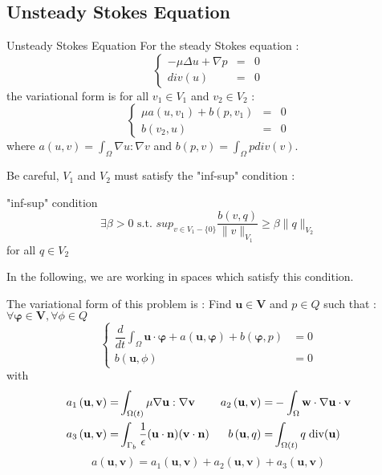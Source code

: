 \subsection{Unsteady Stokes Equation}

\begin{frame}{Unsteady Stokes Equation}
For the steady Stokes equation :
$$
\left\{
\begin{array}{rcl}
- \mu \Delta u + \nabla p & = & 0 \\
div(u) & = & 0 
\end{array}
\right. $$
the variational form is for all $v_1 \in V_1$ and $v_2 \in V_2$ :
$$
\left\{
\begin{array}{rcl}
 \mu a(u,v_1) + b(p,v_1) & = & 0 \\
b(v_2,u) & = & 0 
\end{array}
\right. $$
where $a(u,v) = \int_{\Omega} \nabla u : \nabla v$ and $b(p,v)=\int_{\Omega} p div(v)$.
\end{frame}

\begin{frame}
Be careful, $V_1$ and $V_2$ must satisfy the "inf-sup" condition :
\begin{block}{"inf-sup" condition}
$$\exists \beta > 0 \text{ s.t. } sup_{v \in V_1 -\{0\}} \dfrac{b(v,q)}{\| v \|_{V_1}} \geq \beta \| q \|_{V_2}$$
for all $q \in V_2$
\end{block}
In the following, we are working in spaces which satisfy this condition.
\end{frame}

\begin{frame}
  The variational form of this problem is :
    Find $\mathbf{u}\in \mathbf{V}$ and $p\in Q$ such that : $\forall \bm{\varphi}\in \mathbf{V}, \forall \phi\in Q$
  \begin{equation*}
    \left\{
    \begin{aligned}
      \dfrac{d}{dt}\int_\Omega \mathbf{u}\cdot\bm{\varphi}
      + a(\mathbf{u},\bm{\varphi}) + b\left(\bm{\varphi},p\right) 
      &=0\\
      b(\mathbf{u},\phi) &= 0
    \end{aligned}
    \right.
  \end{equation*}
  with
  \begin{align*}
    a_1\left(\mathbf{u},\mathbf{v}\right) =& \int_{\Omega(t)} \mu \nabla \mathbf{u} : \nabla \mathbf{v}
    & a_2\left(\mathbf{u},\mathbf{v}\right) =&  - \int_\Omega \mathbf{w}\cdot\nabla\mathbf{u}\cdot\mathbf{v}\\
    a_3\left(\mathbf{u},\mathbf{v}\right) =& \int_{\Gamma_b} \frac{1}{\epsilon}(\mathbf{u}\cdot\mathbf{n})(\mathbf{v}\cdot\mathbf{n})
    & b\left( \mathbf{u} , q \right) =&\int_{\Omega(t)} q\; \hbox{div} (\mathbf{u})
  \end{align*}
  \begin{equation*}
    a\left(\mathbf{u},\mathbf{v}\right) = a_1\left(\mathbf{u},\mathbf{v}\right) + a_2\left(\mathbf{u},\mathbf{v}\right) + a_3\left(\mathbf{u},\mathbf{v}\right)
  \end{equation*}
\end{frame}


